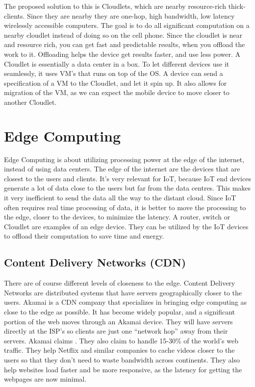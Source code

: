 The proposed solution to this is Cloudlets, which are nearby resource-rich thick-clients. Since they are nearby they are one-hop, high bandwidth, low latency wirelessly accessible computers. The goal is to do all significant computation on a nearby cloudlet instead of doing so on the cell phone. Since the cloudlet is near and resource rich, you can get fast and predictable results, when you offload the work to it. Offloading helps the device get results faster, and use less power. A Cloudlet is essentially a data center in a box. To let different devices use it seamlessly, it uses VM’s that runs on top of the OS. A device can send a specification of a VM to the Cloudlet, and let it spin up. It also allows for migration of the VM, as we can expect the mobile device to move closer to another Cloudlet.










\section{Edge Computing}
Edge Computing is about utilizing processing power at the edge of the internet, instead of using data centers. The edge of the internet are the devices that are closest to the users and clients. It's very relevant for IoT, because IoT end devices generate a lot of data close to the users but far from the data centres. This makes it very inefficient to send the data all the way to the distant cloud. Since IoT often requires real time processing of data, it is better to move the processing to the edge, closer to the devices, to minimize the latency\cite{shi_edge_2016}.
A router, switch or Cloudlet are examples of an edge device. They can be utilized by the IoT devices to offload their computation to save time and energy.

\subsection{Content Delivery Networks (CDN)}
There are of course different levels of closeness to the edge. Content Delivery Networks are distributed systems that have servers geographically closer to the users. Akamai is a CDN company that specializes in bringing edge computing as close to the edge as possible. It has become widely popular, and a significant portion of the web moves through an Akamai device. They will have servers directly at the ISP’s so clients are just one “network hop” away from their servers. Akamai\cite{noauthor_exceptional_nodate} claims . They also claim to handle 15-30\% of the world's web traffic. They help Netflix and similar companies to cache videos closer to the users so that they don't need to waste bandwidth across continents. They also help websites load faster and be more responsive, as the latency for getting the webpages are now minimal.


